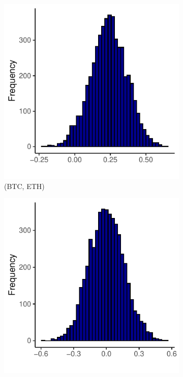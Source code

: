 \documentclass{article}
\begin{document}
\begin{figure}[H]
    \centering
    \begin{subfigure}[b]{0.3\textwidth}  %
        \includegraphics[width=\textwidth]{Figures/hist_BTC_ETH.pdf}
        \caption{(BTC, ETH)}
        \label{fig:boot-sub1}
    \end{subfigure}
    \begin{subfigure}[b]{0.3\textwidth}
        \includegraphics[width=\textwidth]{Figures/hist_LLY_JNJ.pdf}

\end{subfigure}
\end{figure}
\end{document}
